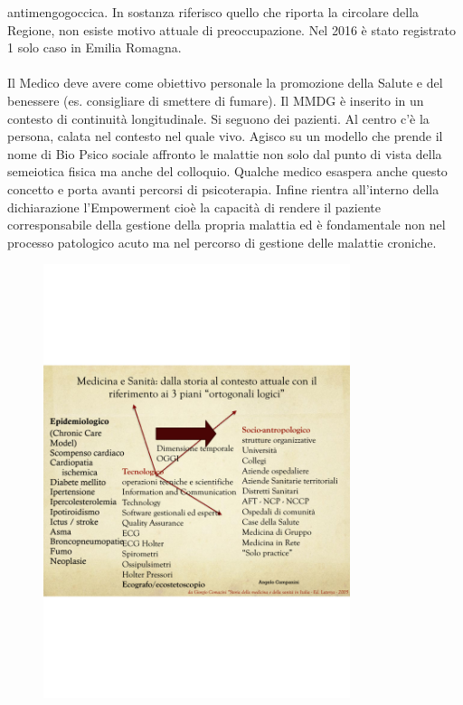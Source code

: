 antimengogoccica. In sostanza riferisco quello che riporta la circolare
della Regione, non esiste motivo attuale di preoccupazione. Nel 2016 è
stato registrato 1 solo caso in Emilia Romagna.
\\\\
Il Medico deve avere come obiettivo personale la promozione della Salute
e del benessere (es. consigliare di smettere di fumare). Il MMDG è
inserito in un contesto di continuità longitudinale. Si seguono dei
pazienti. Al centro c'è la persona, calata nel contesto nel quale vivo.
Agisco su un modello che prende il nome di Bio Psico sociale affronto le
malattie non solo dal punto di vista della semeiotica fisica ma anche
del colloquio. Qualche medico esaspera anche questo concetto e porta
avanti percorsi di psicoterapia. Infine rientra all'interno della
dichiarazione l'Empowerment cioè la capacità di rendere il paziente
corresponsabile della gestione della propria malattia ed è fondamentale
non nel processo patologico acuto ma nel percorso di gestione delle
malattie croniche.

\begin{figure}[!ht]
\centering
	\includegraphics[width=0.8\textwidth]{38/image9.png}
	\end{figure}
	

